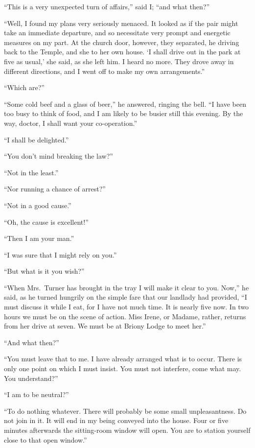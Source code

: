 “This is a very unexpected turn of affairs,” said I; “and
what then?”

“Well, I found my plans very seriously menaced. It looked
as if the pair might take an immediate departure, and so
necessitate very prompt and energetic measures on my part.
At the church door, however, they separated, he driving back
to the Temple, and she to her own house. ‘I shall drive out
in the park at five as usual,’ she said, as she left him. I heard
no more. They drove away in different directions, and I
went off to make my own arrangements.”

“Which are?”

“Some cold beef and a glass of beer,” he answered, ringing
the bell. “I have been too busy to think of food, and I am
likely to be busier still this evening. By the way, doctor, I
shall want your co-operation.”

“I shall be delighted.”

“You don’t mind breaking the law?”

“Not in the least.”

“Nor running a chance of arrest?”

“Not in a good cause.”

“Oh, the cause is excellent!”

“Then I am your man.”

“I was sure that I might rely on you.”

“But what is it you wish?”

“When Mrs.~Turner has brought in the tray I will make it
clear to you. Now,” he said, as he turned hungrily on the
simple fare that our landlady had provided, “I must discuss
it while I eat, for I have not much time. It is nearly five
now. In two hours we must be on the scene of action.
Miss Irene, or Madame, rather, returns from her drive at
seven. We must be at Briony Lodge to meet her.”

“And what then?”

“You must leave that to me. I have already arranged
what is to occur. There is only one point on which I must
insist. You must not interfere, come what may. You understand?”

“I am to be neutral?”

“To do nothing whatever. There will probably be some
small unpleasantness. Do not join in it. It will end in my
being conveyed into the house. Four or five minutes afterwards
the sitting-room window will open. You are to station
yourself close to that open window.”

